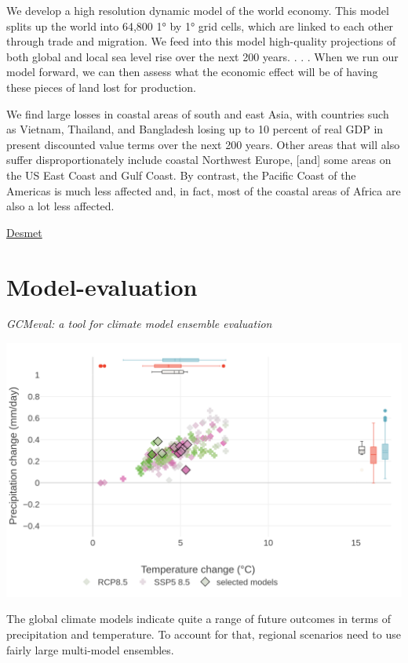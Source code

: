 \documentclass[
]{book}
\begin{document}
We develop a high resolution dynamic model of the world economy. This model splits up the world into 64,800 1° by 1° grid cells, which are linked to each other through trade and migration. We feed into this model high-quality projections of both global and local sea level rise over the next 200 years. . . . When we run our model forward, we can then assess what the economic effect will be of having these pieces of land lost for production.

We find large losses in coastal areas of south and east Asia, with countries such as Vietnam, Thailand, and Bangladesh losing up to 10 percent of real GDP in present discounted value terms over the next 200 years. Other areas that will also suffer disproportionately include coastal Northwest Europe, {[}and{]} some areas on the US East Coast and Gulf Coast. By contrast, the Pacific Coast of the Americas is much less affected and, in fact, most of the coastal areas of Africa are also a lot less affected.

\href{https://www.aeaweb.org/research/klaus-desmet-migration-climate-change}{Desmet}

\hypertarget{model-evaluation}{%
\section{Model-evaluation}\label{model-evaluation}}

\emph{GCMeval: a tool for climate model ensemble evaluation}

\includegraphics{fig/GCMevalNorthEuropeBestModels.png}

The global climate models indicate quite a range of future outcomes in terms of
precipitation and temperature.
To account for that, regional scenarios need to use fairly large multi-model ensembles.
\end{document}
